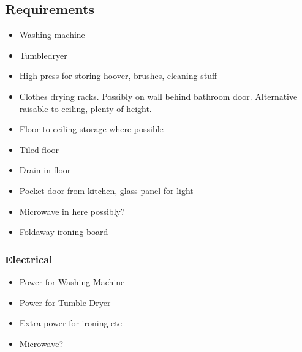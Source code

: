 \subsection{Requirements}
\begin{itemize}
\item Washing machine
\item Tumbledryer
\item High press for storing hoover, brushes, cleaning stuff
\item Clothes drying racks. Possibly on wall behind bathroom door. Alternative raisable to ceiling, plenty of height.
\item Floor to ceiling storage where possible
\item Tiled floor
\item Drain in floor
\item Pocket door from kitchen, glass panel for light
\item Microwave in here possibly?
\item Foldaway ironing board
    
\end{itemize}

\subsubsection{Electrical}
\begin{itemize}
\item Power for Washing Machine
\item Power for Tumble Dryer
\item Extra power for ironing etc
\item Microwave?
\end{itemize}
